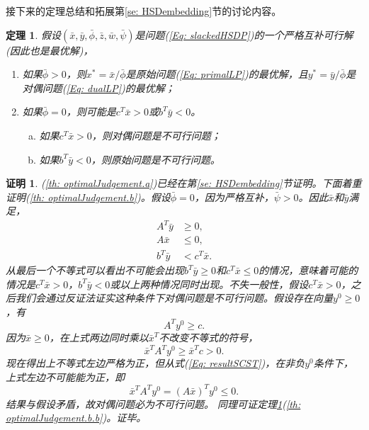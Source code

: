 \documentclass{ctexart}
\numberwithin{equation}{section} %
\newtheorem{theorem}{定理}[section]
\newtheorem*{Proof}{证明}
\begin{document}
接下来的定理总结和拓展第\ref{se: HSDembedding}节的讨论内容。
\begin{theorem}
	\label{th: optimalJudgement}
	假设$ \left(\bar{x}, \bar{y}, \bar{\phi}, \bar{z}, \bar{w}, \bar{\psi}\right) $是问题(\ref{Eq: slackedHSDP})的一个严格互补可行解(因此也是最优解)，
	\begin{enumerate}[(1)]
		\item \label{th: optimalJudgement.a}如果$ \bar{\phi} > 0 $，则$ x^* = \bar{x}/\bar{\phi} $是原始问题(\ref{Eq: primalLP})的最优解，且$ y^* = \bar{y}/\bar{\phi} $是对偶问题(\ref{Eq: dualLP})的最优解；
		\item \label{th: optimalJudgement.b}如果$ \bar{\phi} = 0 $，则可能是$ c^T\bar{x} > 0 $或$ b^T\bar{y} < 0 $。
		\begin{enumerate}[(a)]
			\item \label{th: optimalJudgement.b.a}如果$ c^T\bar{x} > 0 $，则对偶问题是不可行问题；
			\item \label{th: optimalJudgement.b.b}如果$ b^T\bar{y} < 0 $，则原始问题是不可行问题。
		\end{enumerate}
	\end{enumerate}
\end{theorem}
\begin{Proof}
	(\ref{th: optimalJudgement.a})已经在第\ref{se: HSDembedding}节证明。下面着重证明(\ref{th: optimalJudgement.b})。假设$ \bar{\phi} = 0 $，因为严格互补，$ \bar{\psi} > 0 $。因此$ \bar{x} $和$ \bar{y} $满足，
	\begin{equation}
		\label{Eq: resultSCST}
		\begin{aligned}
			A^T\bar{y} & \geq 0, \\
			A\bar{x} & \leq 0, \\
			b^T\bar{y} & < c^T\bar{x}.
		\end{aligned}
	\end{equation}
	从最后一个不等式可以看出不可能会出现$ b^T\bar{y} \geq 0 $和$ c^T\bar{x} \leq 0 $的情况，意味着可能的情况是$ c^T\bar{x} > 0 $，$ b^T\bar{y} < 0 $或以上两种情况同时出现。不失一般性，假设$ c^T\bar{x} > 0 $，之后我们会通过反证法证实这种条件下对偶问题是不可行问题。假设存在向量$ y^0 \geq 0 $，有
	\begin{equation}
		A^Ty^0 \geq c.
	\end{equation}
	因为$ \bar{x} \geq 0 $，在上式两边同时乘以$ \bar{x}^T $不改变不等式的符号，
	\begin{equation}
		\bar{x}^TA^Ty^0 \geq \bar{x}^Tc > 0. \nonumber
	\end{equation}
	现在得出上不等式左边严格为正，但从式(\ref{Eq: resultSCST})，在非负$ y^0 $条件下，上式左边不可能能为正，即
	\begin{equation}
		\bar{x}^TA^Ty^0 = \left(A\bar{x}\right)^Ty^0 \leq 0. \nonumber
	\end{equation}
	结果与假设矛盾，故对偶问题必为不可行问题。
	同理可证定理\ref{th: optimalJudgement}(\ref{th: optimalJudgement.b.b})。证毕。
\end{Proof}
\end{document}

